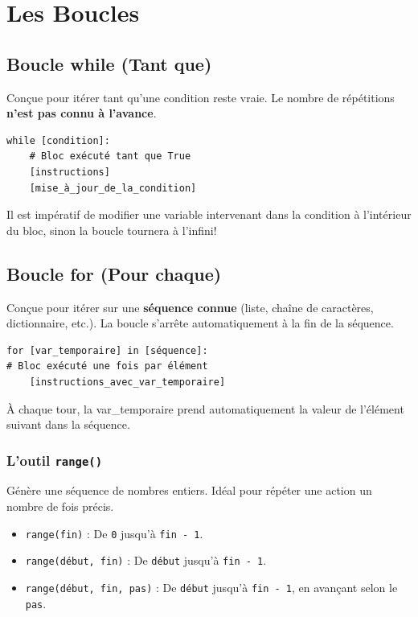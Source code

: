 \section{Les Boucles}

\subsection{Boucle while (Tant que)}

Conçue pour itérer tant qu'une condition reste vraie. Le nombre de répétitions \textbf{n'est pas connu à l'avance}.

\begin{verbatim}
while [condition]:
    # Bloc exécuté tant que True
    [instructions]
    [mise_à_jour_de_la_condition] 
\end{verbatim}

Il est impératif de modifier une variable intervenant dans la condition à l'intérieur du bloc, sinon la boucle tournera à l'infini!

\subsection{Boucle for (Pour chaque)}

Conçue pour itérer sur une \textbf{séquence connue} (liste, chaîne de caractères, dictionnaire, etc.). La boucle s'arrête automatiquement à la fin de la séquence.

\begin{verbatim}
for [var_temporaire] in [séquence]:
# Bloc exécuté une fois par élément
    [instructions_avec_var_temporaire]
\end{verbatim}

À chaque tour, la var\_temporaire prend automatiquement la valeur de l'élément suivant dans la séquence.

\subsubsection{L'outil \texttt{range()}}

Génère une séquence de nombres entiers. Idéal pour répéter une action un nombre de fois précis.

\begin{itemize}
\item \texttt{range(fin)} : De \texttt{0} jusqu'à \texttt{fin - 1}.
\item \texttt{range(début, fin)} : De \texttt{début} jusqu'à \texttt{fin - 1}.
\item \texttt{range(début, fin, pas)} : De \texttt{début} jusqu'à \texttt{fin - 1}, en avançant selon le \texttt{pas}.
\end{itemize}

